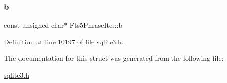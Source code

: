 \subsubsection{\texorpdfstring{b}{b}}
{\footnotesize\ttfamily const unsigned char$\ast$ Fts5\+Phrase\+Iter\+::b}



Definition at line 10197 of file sqlite3.\+h.



The documentation for this struct was generated from the following file\+:\begin{DoxyCompactItemize}
\item 
\mbox{\hyperlink{sqlite3_8h}{sqlite3.\+h}}\end{DoxyCompactItemize}
